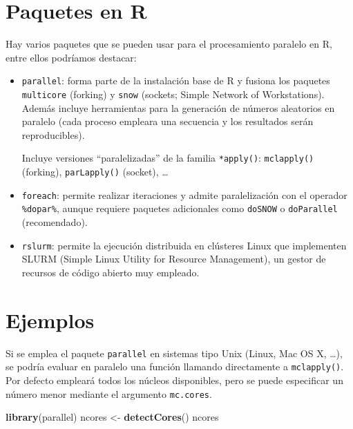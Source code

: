 \documentclass[]{book}
\newenvironment{Shaded}{\begin{snugshade}}{\end{snugshade}}
\newcommand{\KeywordTok}[1]{\textcolor[rgb]{0.13,0.29,0.53}{\textbf{#1}}}
\newcommand{\StringTok}[1]{\textcolor[rgb]{0.31,0.60,0.02}{#1}}
\newcommand{\NormalTok}[1]{#1}
\theoremstyle{break}
\theoremstyle{definition}
\theoremstyle{definition}
\theoremstyle{definition}
\theoremstyle{remark}
\begin{document}
\section{Paquetes en R}\label{paquetes-en-r}

Hay varios paquetes que se pueden usar para el procesamiento paralelo en
R, entre ellos podríamos destacar:

\begin{itemize}
\item
  \texttt{parallel}: forma parte de la instalación base de R y fusiona
  los paquetes \texttt{multicore} (forking) y \texttt{snow} (sockets;
  Simple Network of Workstations). Además incluye herramientas para la
  generación de números aleatorios en paralelo (cada proceso empleara
  una secuencia y los resultados serán reproducibles).

  Incluye versiones ``paralelizadas'' de la familia \texttt{*apply()}:
  \texttt{mclapply()} (forking), \texttt{parLapply()} (socket), \ldots{}
\item
  \texttt{foreach}: permite realizar iteraciones y admite paralelización
  con el operador \texttt{\%dopar\%}, aunque requiere paquetes
  adicionales como \texttt{doSNOW} o \texttt{doParallel} (recomendado).
\item
  \texttt{rslurm}: permite la ejecución distribuida en clústeres Linux
  que implementen SLURM (Simple Linux Utility for Resource Management),
  un gestor de recursos de código abierto muy empleado.
\end{itemize}

\section{Ejemplos}\label{ejemplos-3}

Si se emplea el paquete \texttt{parallel} en sistemas tipo Unix (Linux,
Mac OS X, \ldots{}), se podría evaluar en paralelo una función llamando
directamente a \texttt{mclapply()}. Por defecto empleará todos los
núcleos disponibles, pero se puede especificar un número menor mediante
el argumento \texttt{mc.cores}.

\begin{Shaded}
\begin{Highlighting}[]
\KeywordTok{library}\NormalTok{(parallel)}
\NormalTok{ncores <-}\StringTok{ }\KeywordTok{detectCores}\NormalTok{()}
\NormalTok{ncores}
\end{Highlighting}
\end{Shaded}
\end{document}

